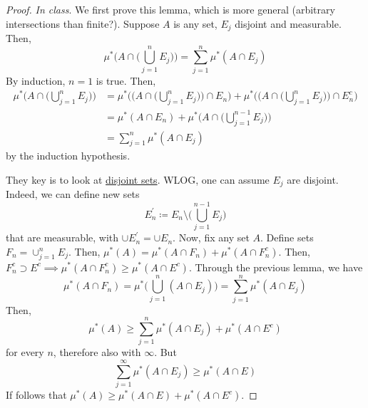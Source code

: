   \begin{proof}
    \textit{In class}. We first prove this lemma, which is more general (arbitrary intersections than finite?). Suppose $A$ is any set, $E_j$ disjoint and measurable. Then, 
    \begin{equation}
      \mu^\ast \bigg( A \cap \Big( \bigcup_{j=1}^n E_j \Big) \bigg) = \sum_{j=1}^n \mu^\ast (A \cap E_j)
    \end{equation}
    By induction, $n = 1$ is true. Then, 
    \begin{align}
      \mu^\ast \bigg( A \cap \Big( \bigcup_{j=1}^n E_j \Big) \bigg) 
        & = \mu^\ast \Bigg( \bigg( A \cap \Big( \bigcup_{j=1}^n E_j \Big) \bigg) \cap E_n \Bigg) + \mu^\ast \Bigg( \bigg( A \cap \Big( \bigcup_{j=1}^n E_j \Big) \bigg) \cap E_n^c \Bigg) \\  
        & = \mu^\ast (A \cap E_n) + \mu^\ast \bigg( A \cap \Big( \bigcup_{j=1}^{n-1} E_j \Big) \bigg) \\ & = \sum_{j=1}^n \mu^\ast (A \cap E_j) \end{align}
    by the induction hypothesis. 
    
    They key is to look at \hyperref[st-def:disjoint-sets]{disjoint sets}. WLOG, one can assume $E_j$ are disjoint. Indeed, we can define new sets 
    \begin{equation}
      E_n^\prime \coloneqq E_n \setminus \bigg( \bigcup_{j=1}^{n-1} E_j \bigg) 
    \end{equation}
    that are measurable, with $\cup E_n^\prime = \cup E_n$. Now, fix any set $A$. Define sets $F_n = \cup_{j=1}^n E_j$. Then, $\mu^\ast (A) = \mu^\ast (A \cap F_n) + \mu^\ast (A \cap F_n^c)$. Then, $F_n^c \supset E^c \implies \mu^\ast (A \cap F_n^c) \geq \mu^\ast (A \cap E^c)$. Through the previous lemma, we have 
    \begin{equation}
      \mu^\ast (A \cap F_n) = \mu^\ast \bigg( \bigcup_{j=1}^n (A \cap E_j) \bigg) = \sum_{j=1}^n \mu^\ast (A \cap E_j) 
    \end{equation}
    Then, 
    \begin{equation}
      \mu^\ast (A) \geq \sum_{j=1}^n \mu^\ast (A \cap E_j) + \mu^\ast (A \cap E^c) 
    \end{equation}
    for every $n$, therefore also with $\infty$. But 
    \begin{equation}
      \sum_{j=1}^\infty \mu^\ast (A \cap E_j) \geq \mu^\ast (A \cap E)
    \end{equation}
    If follows that $\mu^\ast (A) \geq \mu^\ast (A \cap E) + \mu^\ast (A \cap E^c)$. 
  \end{proof}

